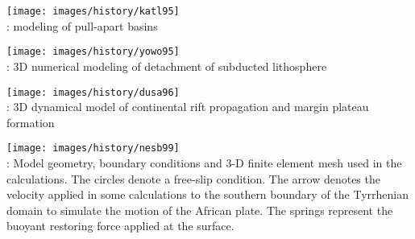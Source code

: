 \begin{center}
\texttt{[image: images/history/katl95]}\\
{: modeling of pull-apart basins \cite{katl95}}
\end{center}


\begin{center}
\begin{minipage}{0.45\textwidth}
\centering
\texttt{[image: images/history/yowo95]}\\
{: 3D numerical modeling of detachment of subducted 
lithosphere \cite{yowo95}}
\end{minipage}\hfill
\begin{minipage}{0.45\textwidth}
\centering
\texttt{[image: images/history/dusa96]}\\
{: 3D dynamical model of continental rift propagation and 
margin plateau formation \cite{dusa96}}
\end{minipage}
\end{center}



\begin{center}
\texttt{[image: images/history/nesb99]}\\
{: Model geometry, boundary conditions and 3-D finite element mesh used in 
the calculations. The circles denote a free-slip condition. The arrow denotes the velocity 
applied in some calculations to the southern boundary of the Tyrrhenian domain to simulate 
the motion of the African plate. The springs represent the buoyant restoring force applied 
at the surface. \cite{nesb99}}
\end{center}




